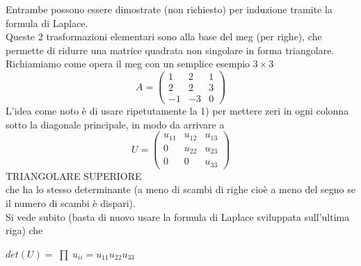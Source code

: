 \documentclass[12pt,a4paper]{article}
\newcommand{\inter}{\begin{matrix}\prod\end{matrix}}
\begin{document}
Entrambe possono essere dimostrate (non richiesto) per induzione tramite la formula di Laplace.\\
Queste 2 trasformazioni elementari sono alla base del meg (per righe), che permette di ridurre una matrice quadrata non singolare in forma triangolare.\\
Richiamiamo come opera il meg con un semplice esempio $3 \times 3$
\begin{equation*}
    A=\begin{pmatrix}
       1 & 2 & 1 \\
       2 & 2 & 3 \\
       -1 & -3 & 0
    \end{pmatrix}
\end{equation*}
L'idea come noto è di usare ripetutamente la 1) per mettere zeri in ogni colonna sotto la diagonale principale, in modo da arrivare a 
\begin{equation*}
    U = \begin{pmatrix}
        u_{11} & u_{12} & u_{13} \\
        0 & u_{22} & u_{23} \\
        0 & 0 & u_{33}
    \end{pmatrix}
\end{equation*}
TRIANGOLARE SUPERIORE\\
che ha lo stesso determinante (a meno di scambi di righe cioè a meno del segno se il numero di scambi è dispari).\\
Si vede subito (basta di nuovo usare la formula di Laplace sviluppata sull'ultima riga) che
\begin{center}
    $det(U) = \inter u_{ii} = u_{11} u_{22} u_{33}$
\end{center}
\end{document}
